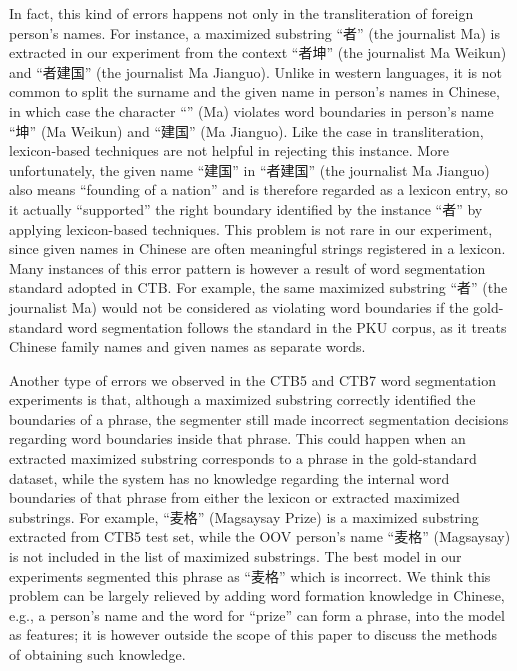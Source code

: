 \documentclass[english]{jnlp_1.4}
\begin{document}
In fact, this kind of errors happens not only in the transliteration of foreign person's names. For instance, a maximized substring ``者'' (the journalist Ma) is extracted in our experiment from the context ``者坤'' (the journalist Ma Weikun) and ``者建国'' (the journalist Ma Jianguo). Unlike in western languages, it is not common to split the surname and the given name in person's names in Chinese, in which case the character ``'' (Ma) violates word boundaries in person's name ``坤'' (Ma Weikun) and ``建国'' (Ma Jianguo). Like the case in transliteration, lexicon-based techniques are not helpful in rejecting this instance. More unfortunately, the given name ``建国'' in ``者建国'' (the journalist Ma Jianguo) also means ``founding of a nation'' and is therefore regarded as a lexicon entry, so it actually ``supported'' the right boundary identified by the instance ``者'' by applying lexicon-based techniques. This problem is not rare in our experiment, since given names in Chinese are often meaningful strings registered in a lexicon. Many instances of this error pattern is however a result of word segmentation standard adopted in CTB. For example, the same maximized substring ``者'' (the journalist Ma) would not be considered as violating word boundaries if the gold-standard word segmentation follows the standard in the PKU corpus, as it treats Chinese family names and given names as separate words.

Another type of errors we observed in the CTB5 and CTB7 word segmentation experiments is that, although a maximized substring correctly identified the boundaries of a phrase, the segmenter still made incorrect segmentation decisions regarding word boundaries inside that phrase. This could happen when an extracted maximized substring corresponds to a phrase in the gold-standard dataset, while the system has no knowledge regarding the internal word boundaries of that phrase from either the lexicon or extracted maximized substrings. For example, ``麦格'' (Magsaysay Prize) is a maximized substring extracted from CTB5 test set, while the OOV person's name ``麦格'' (Magsaysay) is not included in the list of maximized substrings. The best model in our experiments segmented this phrase as ``麦格'' which is incorrect. We think this problem can be largely relieved by adding word formation knowledge in Chinese, e.g., a person's name and the word for ``prize'' can form a phrase, into the model as features; it is however outside the scope of this paper to discuss the methods of obtaining such knowledge.
\end{document}
